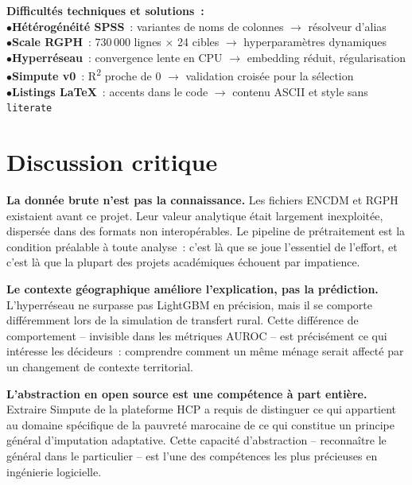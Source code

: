 \documentclass[12pt,a4paper]{report}
\begin{document}
\begin{warningbox}
\small
\textbf{Difficultés techniques et solutions~:}\\[4pt]
$\bullet$\quad \textbf{Hétérogénéité SPSS}~: variantes de noms de colonnes $\to$ résolveur d'alias\\[3pt]
$\bullet$\quad \textbf{Scale RGPH}~: 730\,000 lignes $\times$ 24 cibles $\to$ hyperparamètres dynamiques\\[3pt]
$\bullet$\quad \textbf{Hyperréseau}~: convergence lente en CPU $\to$ embedding réduit, régularisation\\[3pt]
$\bullet$\quad \textbf{Simpute v0}~: R\textsuperscript{2} proche de 0 $\to$ validation croisée pour la sélection\\[3pt]
$\bullet$\quad \textbf{Listings LaTeX}~: accents dans le code $\to$ contenu ASCII et style sans \texttt{literate}
\end{warningbox}

\section{Discussion critique}

\textbf{La donnée brute n'est pas la connaissance.} Les fichiers ENCDM et RGPH existaient avant ce projet. Leur valeur analytique était largement inexploitée, dispersée dans des formats non interopérables. Le pipeline de prétraitement est la condition préalable à toute analyse~: c'est là que se joue l'essentiel de l'effort, et c'est là que la plupart des projets académiques échouent par impatience.

\textbf{Le contexte géographique améliore l'explication, pas la prédiction.} L'hyperréseau ne surpasse pas LightGBM en précision, mais il se comporte différemment lors de la simulation de transfert rural. Cette différence de comportement -- invisible dans les métriques AUROC -- est précisément ce qui intéresse les décideurs~: comprendre comment un même ménage serait affecté par un changement de contexte territorial.

\textbf{L'abstraction en open source est une compétence à part entière.} Extraire Simpute de la plateforme HCP a requis de distinguer ce qui appartient au domaine spécifique de la pauvreté marocaine de ce qui constitue un principe général d'imputation adaptative. Cette capacité d'abstraction -- reconnaître le général dans le particulier -- est l'une des compétences les plus précieuses en ingénierie logicielle.

\end{document}
